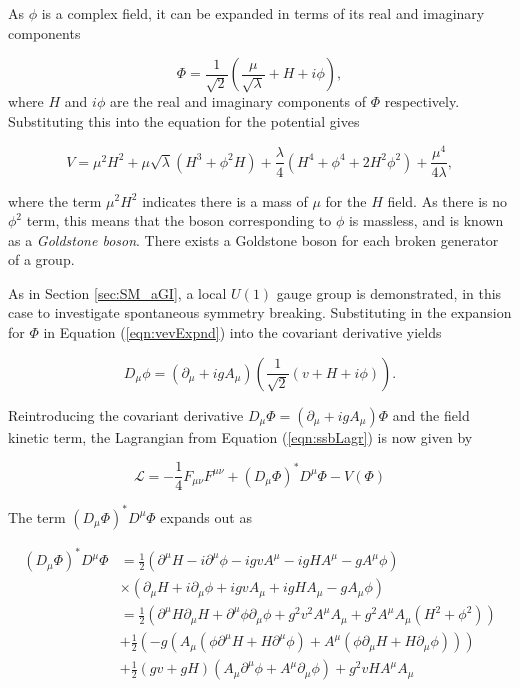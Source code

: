 \documentclass{article}
\begin{document}
As $\phi$ is a complex field, it can be expanded in terms of its real and imaginary components 

\begin{equation}
\label{eqn:vevExpnd}
\Phi = \frac{1}{\sqrt{2}}\left( \frac{\mu}{\sqrt{\lambda}} + H + i\phi \right),
\end{equation}
where $H$ and $i\phi$ are the real and imaginary components of $\Phi$ respectively.
Substituting this into the equation for the potential gives

\begin{equation}
    V = \mu^2 H^2 + \mu\sqrt{\lambda}(H^3 + \phi^2 H) + \frac{\lambda}{4}(H^4 + \phi^4 + 2H^2\phi^2) + \frac{\mu^4}{4\lambda},
\end{equation}

where the term $\mu^2 H^2$ indicates there is a mass of $\mu$ for the $H$ field. As there is no $\phi^2$ term, this means that the boson corresponding to $\phi$ is massless, and is known as a \textit{Goldstone boson}\cite{GoldstoneTheorem}. There exists a Goldstone boson for each broken generator of a group.

As in Section \ref{sec:SM_aGI}, a local $U(1)$ gauge group is demonstrated, in this case to investigate spontaneous symmetry breaking. Substituting in the expansion for $\Phi$ in Equation (\ref{eqn:vevExpnd}) into the covariant derivative yields

\begin{equation}
D_\mu\phi = \left(\partial_\mu + igA_\mu\right)\left( \frac{1}{\sqrt{2}}(v+H+i\phi)\right).
\end{equation}

Reintroducing the covariant derivative $D_\mu \Phi = (\partial_\mu + ig A_\mu)\Phi$ and the field kinetic term, the Lagrangian from Equation (\ref{eqn:ssbLagr}) is now given by

\begin{equation}
    \mathcal{L} = -\frac{1}{4}F_{\mu\nu}F^{\mu\nu} + (D_\mu \Phi)^* D^\mu \Phi - V(\Phi)
\end{equation}

The term $(D_\mu \Phi)^* D^\mu \Phi$ expands out as

\begin{equation}
\begin{split}
(D_\mu \Phi)^* D^\mu \Phi & = \frac{1}{2}\left(\partial^\mu H - i\partial^\mu\phi - igvA^\mu - igHA^\mu - gA^\mu\phi\right) \\
&\times\left( \partial_\mu H + i\partial_\mu\phi + igvA_\mu + igHA_\mu - gA_\mu\phi \right) \\
& = \frac{1}{2}\left( \partial^\mu H \partial_\mu H + \partial^\mu\phi\partial_\mu\phi + g^2v^2A^\mu A_\mu + g^2A^\mu A_\mu(H^2 + \phi^2) \right)\\
&+\frac{1}{2}\left( -g(A_\mu(\phi\partial^\mu H + H\partial^\mu\phi) + A^\mu(\phi\partial_\mu H + H\partial_\mu\phi))\right) \\
& + \frac{1}{2}(gv+gH)(A_\mu \partial^\mu\phi + A^\mu\partial_\mu\phi) + g^2vHA^\mu A_\mu 
\end{split}
\end{equation}
\end{document}
